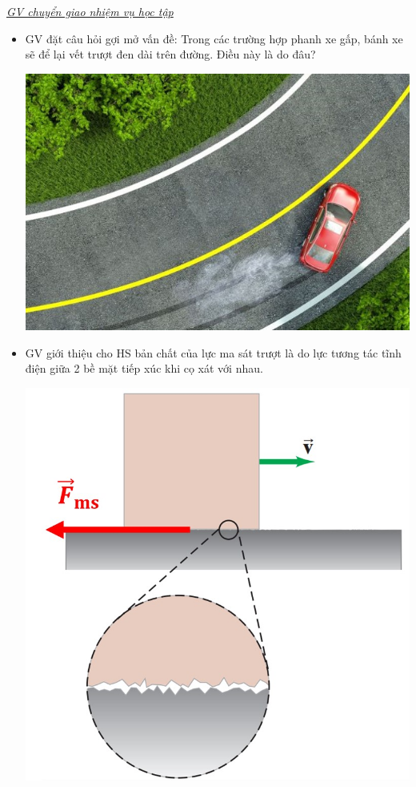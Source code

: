 {	\textit{\underline{GV chuyển giao nhiệm vụ học tập}}
	\begin{itemize}[label=-]
		\item GV đặt câu hỏi gợi mở vấn đề: Trong các trường hợp phanh xe gấp, bánh xe sẽ để lại vết trượt đen dài trên đường. Điều này là do đâu?
		\begin{center}
			\includegraphics[scale=0.4]{figs/G10-BAI11-2}
		\end{center}
		\item GV giới thiệu cho HS bản chất của lực ma sát trượt là do lực tương tác tĩnh điện giữa 2 bề mặt tiếp xúc khi cọ xát với nhau.
		\begin{center}
			\includegraphics[scale=0.5]{figs/G10-BAI11-3}

\end{center}
\end{itemize}}
